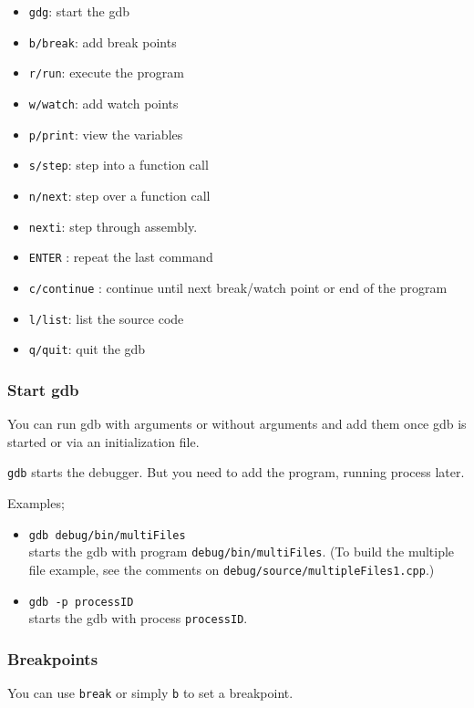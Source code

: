 \begin{itemize}
  \item \texttt{gdg}: start the gdb
  \item \texttt{b/break}: add break points
  \item \texttt{r/run}: execute the program
  \item \texttt{w/watch}: add watch points
  \item \texttt{p/print}: view the variables
  \item \texttt{s/step}: step into a function call
  \item \texttt{n/next}: step over a function call
  \item \texttt{nexti}: step through assembly.
  \item \texttt{ENTER} : repeat the last command
  \item \texttt{c/continue} : continue until next break/watch point or end of the program
  \item \texttt{l/list}: list the source code
  \item \texttt{q/quit}: quit the gdb
\end{itemize}


\subsubsection{Start gdb}
You can run gdb with arguments or without arguments and add them once gdb is started or via an initialization file.


\texttt{gdb} starts the debugger. But you need to add the program, running process later.

Examples;
\begin{itemize}

  \item \texttt{gdb debug/bin/multiFiles} \\
    starts the gdb with program \texttt{debug/bin/multiFiles}.
    (To build the multiple file example, see the comments on \texttt{debug/source/multipleFiles1.cpp}.)


  \item \texttt{gdb -p processID} \\
    starts the gdb with process \texttt{processID}.


\end{itemize}


\subsubsection{Breakpoints}
You can use \texttt{break} or simply \texttt{b} to set a breakpoint.

